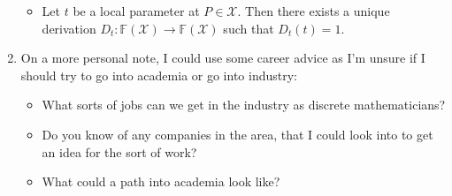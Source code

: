 \documentclass[11pt]{article}
\begin{document}
\begin{enumerate}
        \begin{itemize}
\item Let $t$ be a local parameter at $P \in \mathcal{X}$. Then there exists a unique derivation $D_t: \mathbb{F}(\mathcal{X}) \to \mathbb{F}(\mathcal{X})$ such that $D_t(t) = 1$.
        \end{itemize}
  \item On a more personal note, I could use some career advice as I'm unsure if I should try to go into academia or go into industry:
    \begin{itemize}
      \item What sorts of jobs can we get in the industry as discrete mathematicians?
      \item Do you know of any companies in the area, that I could look into to get an idea for the sort of work?
      \item What could a path into academia look like?
    \end{itemize}
\end{enumerate}
\end{document}
